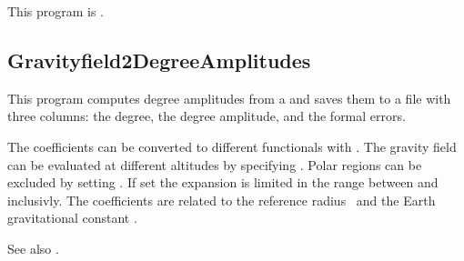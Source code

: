 This program is .
\clearpage
\subsection{Gravityfield2DegreeAmplitudes}\label{Gravityfield2DegreeAmplitudes}
This program computes degree amplitudes from a 
and saves them to a  file with three columns: the degree, the degree amplitude, and the formal errors.

The coefficients can be converted to different functionals with .
The gravity field can be evaluated at different altitudes by specifying .
Polar regions can be excluded by setting .
If set the expansion is limited in the range between 
and  inclusivly.
The coefficients are related to the reference radius~
and the Earth gravitational constant .

See also .


